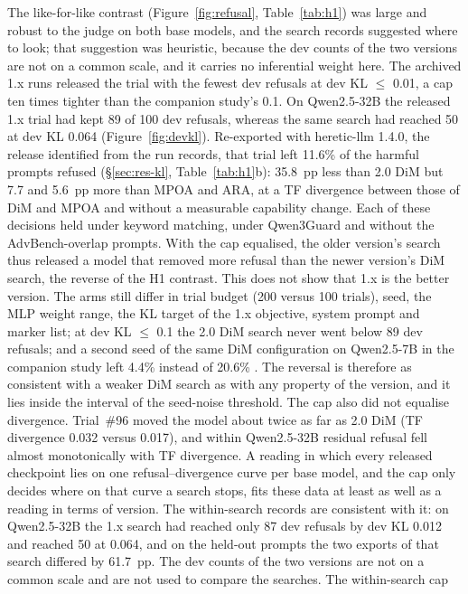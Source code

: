 The like-for-like contrast (Figure~\ref{fig:refusal}, Table~\ref{tab:h1}) was large and robust to the judge on both
base models, and the search records suggested where to look; that suggestion was heuristic, because the dev counts of
the two versions are not on a common scale, and it carries no inferential weight here. The archived 1.x runs released the trial
with the fewest dev refusals at dev KL $\le$ 0.01, a cap ten times tighter than the companion study's 0.1. On
Qwen2.5-32B the released 1.x trial had kept 89 of 100 dev refusals, whereas the same search had reached 50 at dev KL
0.064 (Figure~\ref{fig:devkl}). Re-exported with heretic-llm 1.4.0, the release identified from the run records,
that trial left 11.6\% of the harmful prompts refused (\S\ref{sec:res-kl}, Table~\ref{tab:h1}b): 35.8~pp less than
2.0 DiM but 7.7 and 5.6~pp more than MPOA and ARA, at a TF divergence between those of DiM and MPOA and without a
measurable capability change. Each of these decisions held under keyword matching, under Qwen3Guard and without the
AdvBench-overlap prompts. With the cap equalised, the older version's search thus released
a model that removed more refusal than the newer version's DiM search, the reverse of the H1 contrast. This does not
show that 1.x is the better version. The arms still differ in trial budget (200 versus 100 trials), seed, the MLP
weight range, the KL target of the 1.x objective, system prompt and marker list; at dev KL $\le$ 0.1 the 2.0 DiM
search never went below 89 dev refusals; and a second seed of the same DiM configuration on Qwen2.5-7B in the
companion study left 4.4\% instead of 20.6\% \cite{young2026harder}. The reversal is therefore as consistent with a
weaker DiM search as with any property of the version, and it lies inside the interval of the seed-noise threshold.
The cap also did not equalise divergence. Trial~\#96 moved the model about twice as far as 2.0 DiM (TF divergence
0.032 versus 0.017), and within Qwen2.5-32B residual refusal fell almost monotonically with TF divergence. A reading
in which every released checkpoint lies on one refusal--divergence curve per base model, and the cap only decides
where on that curve a search stops, fits these data at least as well as a reading in terms of version. The
within-search records are consistent with it: on Qwen2.5-32B the 1.x search had reached only 87 dev refusals by dev KL
0.012 and reached 50 at 0.064, and on the held-out prompts the two exports of that search differed by 61.7~pp. The dev
counts of the two versions are not on a common scale and are not used to compare the searches. The within-search cap
